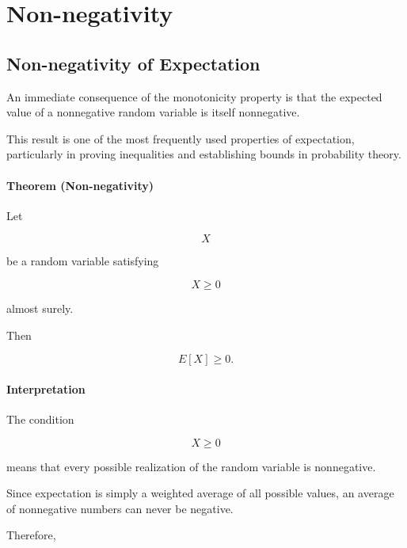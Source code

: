 \documentclass[11pt]{article}
\begin{document}
	
	\section{Non-negativity}
	\begin{mdframed}[
		linewidth=0.8pt,
		roundcorner=6pt,
		backgroundcolor=gray!5,
		linecolor=gray!60,
		innertopmargin=10pt,
		innerbottommargin=10pt,
		innerleftmargin=10pt,
		innerrightmargin=10pt
		]
		
		\subsection*{Non-negativity of Expectation}
		
		An immediate consequence of the monotonicity property is that the expected
		value of a nonnegative random variable is itself nonnegative.
		
		This result is one of the most frequently used properties of expectation,
		particularly in proving inequalities and establishing bounds in probability
		theory.
		
		\bigskip
		
		\paragraph{Theorem (Non-negativity)}
		
		Let
		
		\[
		X
		\]
		
		be a random variable satisfying
		
		\[
		X\ge0
		\]
		
		almost surely.
		
		Then
		
		\[
		\boxed{
			E[X]\ge0.
		}
		\]
		
		\bigskip
		
		\paragraph{Interpretation}
		
		The condition
		
		\[
		X\ge0
		\]
		
		means that every possible realization of the random variable is
		nonnegative.
		
		Since expectation is simply a weighted average of all possible values, an
		average of nonnegative numbers can never be negative.
		
		Therefore,
		

\end{mdframed}
\end{document}
